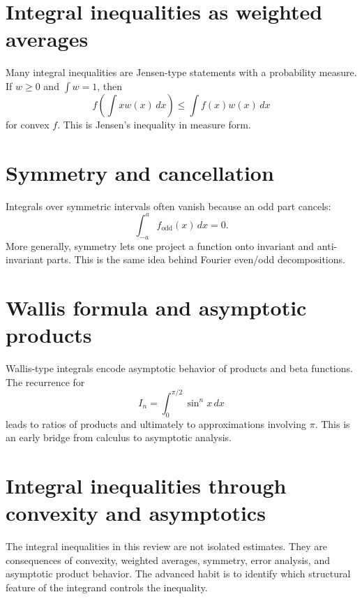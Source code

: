 \section{Integral inequalities as weighted averages}

Many integral inequalities are Jensen-type statements with a probability measure.  If \(w\ge0\) and \(\int w=1\), then
\[
  f\left(\int xw(x)\,dx\right)\le \int f(x)w(x)\,dx
\]
for convex \(f\).  This is Jensen's inequality in measure form.

\section{Symmetry and cancellation}

Integrals over symmetric intervals often vanish because an odd part cancels:
\[
  \int_{-a}^{a} f_{\mathrm{odd}}(x)\,dx=0.
\]
More generally, symmetry lets one project a function onto invariant and anti-invariant parts.  This is the same idea behind Fourier even/odd decompositions.

\section{Wallis formula and asymptotic products}

Wallis-type integrals encode asymptotic behavior of products and beta functions.  The recurrence for
\[
  I_n=\int_0^{\pi/2}\sin^n x\,dx
\]
leads to ratios of products and ultimately to approximations involving \(\pi\).  This is an early bridge from calculus to asymptotic analysis.

\section{Integral inequalities through convexity and asymptotics}

The integral inequalities in this review are not isolated estimates.  They are consequences of convexity, weighted averages, symmetry, error analysis, and asymptotic product behavior.  The advanced habit is to identify which structural feature of the integrand controls the inequality.
